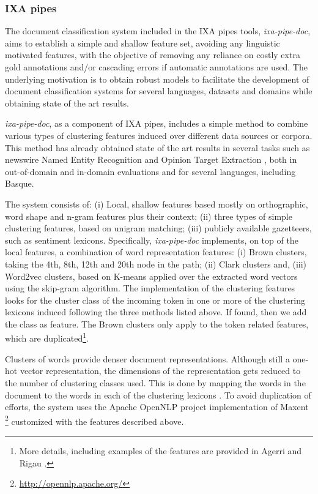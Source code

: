 \documentclass[information,article,submit,moreauthors,pdftex,10pt,a4paper]{Definitions/mdpi}
\begin{document}
\subsubsection{IXA pipes}\label{sec:ixa}

The document classification system included in the IXA pipes tools, \emph{ixa-pipe-doc}, aims to establish a simple and shallow feature set, avoiding any linguistic motivated features, with the objective of removing any reliance on costly extra gold annotations and/or cascading errors if automatic annotations are used. The underlying motivation is to obtain robust models to facilitate the development of document classification systems for several languages, datasets and domains while obtaining state of the art results.

\emph{ixa-pipe-doc}, as a component of IXA pipes, includes a simple method to combine various types of clustering features induced over different data sources or corpora. This method has already obtained state of the art results in several tasks such as newswire Named Entity Recognition \cite{agerri2016robust} and Opinion Target Extraction \cite{agerri2019language}, both in out-of-domain and in-domain evaluations and for several languages, including Basque.

The system consists of: (i) Local, shallow features based mostly on orthographic, word shape and n-gram features plus their context; (ii) three types of simple clustering features, based on unigram matching; (iii) publicly available gazetteers, such as sentiment lexicons. Specifically, \emph{ixa-pipe-doc} implements, on top of the local features, a combination of word representation features: (i) Brown \cite{brown1992class} clusters, taking the 4th, 8th, 12th and 20th node in the path; (ii) Clark \cite{clark2003combining} clusters and, (iii) Word2vec \cite{mikolov2013distributed} clusters, based on K-means applied over the extracted word vectors using the skip-gram algorithm. The implementation of the clustering features looks for the cluster class of the incoming token in one or more of the clustering lexicons induced following the three methods listed above. If found, then we add the class as feature. The Brown clusters only apply to the token related features, which are duplicated\footnote{More details, including examples of the features are provided in Agerri and Rigau \cite{agerri2016robust,agerri2019language}.}.

Clusters of words provide denser document representations. Although still a one-hot vector representation, the dimensions of the representation gets reduced to the number of clustering classes used. This is done by mapping the words in the document to the words in each of the clustering lexicons \cite{turian-ratinov-bengio:2010:ACL}. To avoid duplication of efforts, the system uses the Apache OpenNLP project implementation of Maxent \footnote{\url{http://opennlp.apache.org/}} customized with the features described above.
\end{document}
